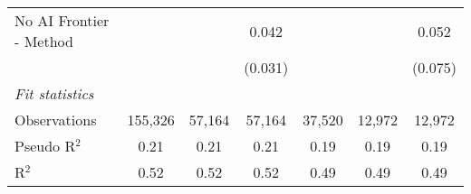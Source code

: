\begin{tabular}{lcccccc}
   No AI Frontier - Method &               &               & 0.042         &               &               & 0.052\\   
                           &               &               & (0.031)       &               &               & (0.075)\\   
   \midrule
   \emph{Fit statistics}\\
   Observations            & 155,326       & 57,164        & 57,164        & 37,520        & 12,972        & 12,972\\  
   Pseudo R$^2$            & 0.21          & 0.21          & 0.21          & 0.19          & 0.19          & 0.19\\  
   R$^2$                   & 0.52          & 0.52          & 0.52          & 0.49          & 0.49          & 0.49\\  
   

\end{tabular}
